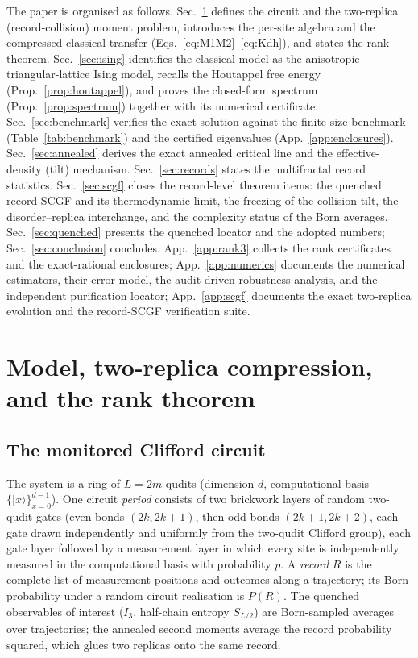 \documentclass[11pt]{article}
\begin{document}
The paper is organised as follows.  Sec.~\ref{sec:model} defines the circuit
and the two-replica (record-collision) moment problem, introduces the
per-site algebra and the compressed classical transfer
(Eqs.~\ref{eq:M1M2}--\ref{eq:Kdh}), and states the rank theorem.
Sec.~\ref{sec:ising} identifies the classical model as the anisotropic
triangular-lattice Ising model, recalls the Houtappel free energy
(Prop.~\ref{prop:houtappel}), and proves the closed-form spectrum
(Prop.~\ref{prop:spectrum}) together with its numerical certificate.
Sec.~\ref{sec:benchmark} verifies the exact solution against the
finite-size benchmark (Table~\ref{tab:benchmark}) and the certified
eigenvalues (App.~\ref{app:enclosures}).  Sec.~\ref{sec:annealed} derives the
exact annealed critical line and the effective-density (tilt) mechanism.
Sec.~\ref{sec:records} states the multifractal record statistics.
Sec.~\ref{sec:scgf} closes the record-level theorem items: the quenched
record SCGF and its thermodynamic limit, the freezing of the collision tilt,
the disorder--replica interchange, and the complexity status of the Born
averages.
Sec.~\ref{sec:quenched} presents the quenched locator and the adopted
numbers; Sec.~\ref{sec:conclusion} concludes.  App.~\ref{app:rank3} collects
the rank certificates and the exact-rational enclosures; App.~\ref{app:numerics}
documents the numerical estimators, their error model, the audit-driven
robustness analysis, and the independent purification locator;
App.~\ref{app:scgf} documents the exact two-replica evolution and the
record-SCGF verification suite.

\section{Model, two-replica compression, and the rank theorem}
\label{sec:model}

\subsection{The monitored Clifford circuit}
\label{sec:circuit}

The system is a ring of $L=2m$ qudits (dimension $d$, computational basis
$\{|x\rangle\}_{x=0}^{d-1}$).  One circuit \emph{period} consists of two
brickwork layers of random two-qudit gates (even bonds $(2k,2k+1)$, then odd
bonds $(2k+1,2k+2)$, each gate drawn independently and uniformly from the
two-qudit Clifford group), each gate layer followed by a measurement layer in
which every site is independently measured in the computational basis with
probability $p$.  A \emph{record} $R$ is the complete list of measurement
positions and outcomes along a trajectory; its Born probability under a
random circuit realisation is $P(R)$.  The quenched observables of interest
($I_3$, half-chain entropy $S_{L/2}$) are Born-sampled averages over
trajectories; the annealed second moments average the record probability
squared, which glues two replicas onto the same record.
\end{document}
